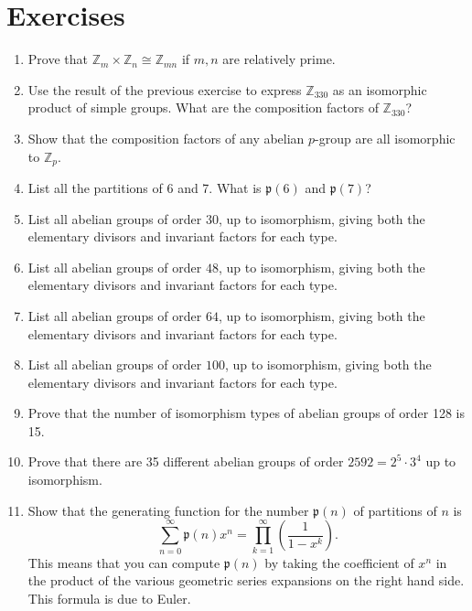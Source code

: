 \documentclass[11pt,oneside]{article}
\newenvironment{problems}
{
 \begin{enumerate}[topsep=1pt,itemsep=0pt,parsep=2pt,leftmargin=0.6cm,%
 label={\arabic*.}, ref=\arabic*] \small
}
{
 \end{enumerate}
}
\theoremstyle{definition}
\newcommand{\Z}{\mathbb{Z}} %
\newcommand{\ptn}{\mathfrak{p}}
\begin{document}
\section*{Exercises}
\begin{problems}

\item Prove that $\Z_m \times \Z_n \cong \Z_{mn}$ if $m,n$ are
  relatively prime. 

\item Use the result of the previous exercise to express $\Z_{330}$ as
  an isomorphic product of simple groups. What are the composition
  factors of $\Z_{330}$?

\item Show that the composition factors of any abelian $p$-group are
  all isomorphic to $\Z_p$.

\item List all the partitions of 6 and 7. What is $\ptn(6)$ and
  $\ptn(7)$?

\item List all abelian groups of order $30$, up to isomorphism, giving
  both the elementary divisors and invariant factors for each type.

\item List all abelian groups of order $48$, up to isomorphism, giving
  both the elementary divisors and invariant factors for each type.

\item List all abelian groups of order $64$, up to isomorphism, giving
  both the elementary divisors and invariant factors for each type.

\item List all abelian groups of order $100$, up to isomorphism, giving
  both the elementary divisors and invariant factors for each type.

\item Prove that the number of isomorphism types of abelian groups of
  order 128 is 15.

\item Prove that there are 35 different abelian groups of order $2592
  = 2^5 \cdot 3^4$ up to isomorphism. 

\item Show that the generating function for the number $\ptn(n)$ of
  partitions of $n$ is
  $$\sum_{n=0}^{\infty} \ptn(n)x^{n} = \prod_{k=1}^{\infty}
  \left({\frac {1}{1-x^{k}}}\right).$$ This means that you can compute
  $\ptn(n)$ by taking the coefficient of $x^n$ in the product of the
  various geometric series expansions on the right hand side. This
  formula is due to Euler.
\end{problems}
\end{document}
